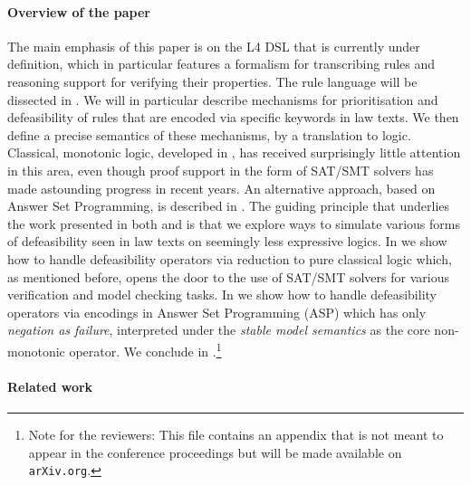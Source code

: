 
\paragraph{Overview of the paper}
The main emphasis of this paper is on the L4 DSL that is currently under
definition, which in particular features a formalism for transcribing rules
and reasoning support for verifying their properties.
The rule language will be dissected in
. We will in particular describe mechanisms
for prioritisation and defeasibility of rules that are encoded via specific
keywords in law texts. We then define a precise semantics of these mechanisms,
by a translation to logic. Classical, monotonic logic, developed in
, has received surprisingly little attention
in this area, even though proof support in the form of SAT/SMT solvers has
made astounding progress in recent years. An alternative approach, based on
Answer Set Programming, is described in
. The guiding principle
that underlies the work presented in both 
and  is that we explore ways to simulate various
forms of defeasibility seen in law texts on seemingly less expressive
logics. In  we show how to handle
defeasibility operators via reduction to pure classical logic which, as
mentioned before, opens the door to the use of SAT/SMT solvers for various
verification and model checking tasks. In  we show
how to handle defeasibility operators via encodings in Answer Set Programming
(ASP) which has only \emph{negation as failure}, interpreted under the
\emph{stable model semantics} as the core non-monotonic operator. We conclude
in .\footnote{Note for the reviewers: This file
  contains an appendix that is not meant to appear in the conference
  proceedings but will be made available on \texttt{arXiv.org}.}


\paragraph{Related work}

